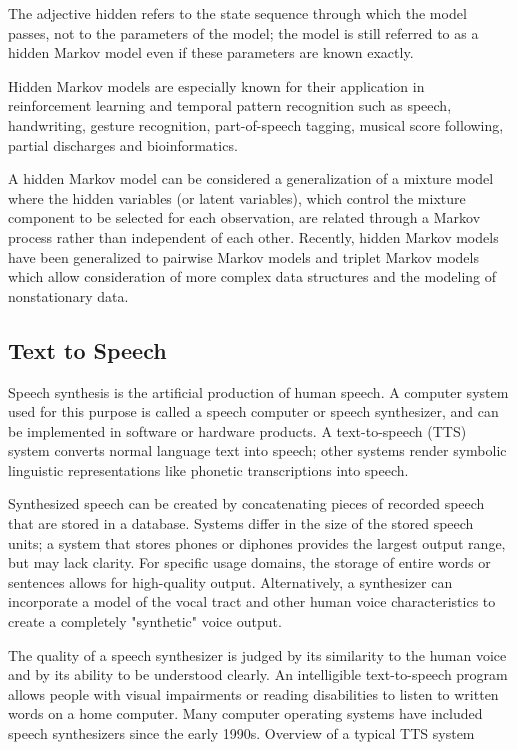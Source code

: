 \documentclass[12pt,a4paper]{article}
\begin{document}
The adjective hidden refers to the state sequence through which the model passes, not to the parameters of the model; the model is still referred to as a hidden Markov model even if these parameters are known exactly.

Hidden Markov models are especially known for their application in reinforcement learning and temporal pattern recognition such as speech, handwriting, gesture recognition, part-of-speech tagging, musical score following, partial discharges and bioinformatics.

A hidden Markov model can be considered a generalization of a mixture model where the hidden variables (or latent variables), which control the mixture component to be selected for each observation, are related through a Markov process rather than independent of each other. Recently, hidden Markov models have been generalized to pairwise Markov models and triplet Markov models which allow consideration of more complex data structures and the modeling of nonstationary data. 

\newpage

\begin{center}
\section{Text to Speech}
\end{center}
Speech synthesis is the artificial production of human speech. A computer system used for this purpose is called a speech computer or speech synthesizer, and can be implemented in software or hardware products. A text-to-speech (TTS) system converts normal language text into speech; other systems render symbolic linguistic representations like phonetic transcriptions into speech.

Synthesized speech can be created by concatenating pieces of recorded speech that are stored in a database. Systems differ in the size of the stored speech units; a system that stores phones or diphones provides the largest output range, but may lack clarity. For specific usage domains, the storage of entire words or sentences allows for high-quality output. Alternatively, a synthesizer can incorporate a model of the vocal tract and other human voice characteristics to create a completely "synthetic" voice output.

The quality of a speech synthesizer is judged by its similarity to the human voice and by its ability to be understood clearly. An intelligible text-to-speech program allows people with visual impairments or reading disabilities to listen to written words on a home computer. Many computer operating systems have included speech synthesizers since the early 1990s.
Overview of a typical TTS system
	
\end{document}

